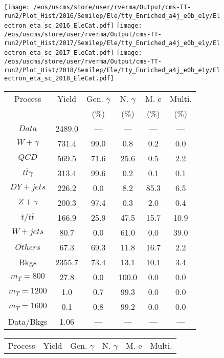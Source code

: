 \begin{figure}
\centering
\texttt{[image: /eos/uscms/store/user/rverma/Output/cms-TT-run2/Plot\_Hist/2016/Semilep/Ele/tty\_Enriched\_a4j\_e0b\_e1y/Electron\_eta\_sc\_2016\_EleCat.pdf]}
\texttt{[image: /eos/uscms/store/user/rverma/Output/cms-TT-run2/Plot\_Hist/2017/Semilep/Ele/tty\_Enriched\_a4j\_e0b\_e1y/Electron\_eta\_sc\_2017\_EleCat.pdf]}
\texttt{[image: /eos/uscms/store/user/rverma/Output/cms-TT-run2/Plot\_Hist/2018/Semilep/Ele/tty\_Enriched\_a4j\_e0b\_e1y/Electron\_eta\_sc\_2018\_EleCat.pdf]}
\begin{minipage}[c]{0.32\textwidth}
\centering
\tiny{
\begin{tabular}{cccccc}
\hline
Process & Yield & Gen. $\gamma$ & N. $\gamma$ & M. e & Multi. \\
 &  & (\%) & (\%) & (\%) & (\%)  \\
\hline
                                                                      $ Data $ &  2489.0 &  --- &  --- &  --- &  ---\\
$ W+\gamma $ &  731.4 &  99.0 &  0.8 &  0.2 &  0.0\\
$ QCD $ &  569.5 &  71.6 &  25.6 &  0.5 &  2.2\\
$ t\bar{t}\gamma $ &  313.4 &  99.6 &  0.2 &  0.1 &  0.1\\
$ DY+jets $ &  226.2 &  0.0 &  8.2 &  85.3 &  6.5\\
$ Z+\gamma $ &  200.3 &  97.4 &  0.3 &  2.0 &  0.4\\
$ t/t\bar{t} $ &  166.9 &  25.9 &  47.5 &  15.7 &  10.9\\
$ W+jets $ &  80.7 &  0.0 &  61.0 &  0.0 &  39.0\\
$ Others $ &  67.3 &  69.3 &  11.8 &  16.7 &  2.2\\
Bkgs &  2355.7 &  73.4 &  13.1 &  10.1 &  3.4\\
$ m_{T} = 800 $ &  27.8 &  0.0 &  100.0 &  0.0 &  0.0\\
$ m_{T} = 1200 $ &  1.0 &  0.7 &  99.3 &  0.0 &  0.0\\
$ m_{T} = 1600 $ &  0.1 &  0.8 &  99.2 &  0.0 &  0.0\\
Data/Bkgs &  1.06 &  --- &  --- &  --- &  ---\\
\hline
\end{tabular}
}
\end{minipage}
\begin{minipage}[c]{0.32\textwidth}
\centering
\tiny{
\begin{tabular}{cccccc}
\hline
Process & Yield & Gen. $\gamma$ & N. $\gamma$ & M. e & Multi. \\

\end{tabular}}
\end{minipage}
\end{figure}
